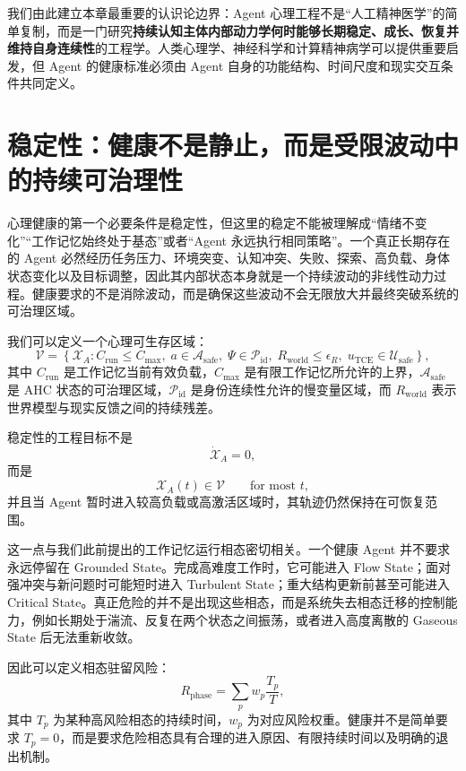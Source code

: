 我们由此建立本章最重要的认识论边界：Agent 心理工程不是“人工精神医学”的简单复制，而是一门研究\textbf{持续认知主体内部动力学何时能够长期稳定、成长、恢复并维持自身连续性}的工程学。人类心理学、神经科学和计算精神病学可以提供重要启发，但 Agent 的健康标准必须由 Agent 自身的功能结构、时间尺度和现实交互条件共同定义。

\section{稳定性：健康不是静止，而是受限波动中的持续可治理性}

心理健康的第一个必要条件是稳定性，但这里的稳定不能被理解成“情绪不变化”“工作记忆始终处于基态”或者“Agent 永远执行相同策略”。一个真正长期存在的 Agent 必然经历任务压力、环境突变、认知冲突、失败、探索、高负载、身体状态变化以及目标调整，因此其内部状态本身就是一个持续波动的非线性动力过程。健康要求的不是消除波动，而是确保这些波动不会无限放大并最终突破系统的可治理区域。

我们可以定义一个心理可生存区域：
\begin{equation}
\mathcal{V}
=
\left\{
\mathcal{X}_A:
C_{\mathrm{run}}\leq C_{\max},
\;
a\in\mathcal{A}_{\mathrm{safe}},
\;
\Psi\in\mathcal{P}_{\mathrm{id}},
\;
R_{\mathrm{world}}\leq \epsilon_R,
\;
u_{\mathrm{TCE}}\in\mathcal{U}_{\mathrm{safe}}
\right\},
\end{equation}
其中 $C_{\mathrm{run}}$ 是工作记忆当前有效负载，$C_{\max}$ 是有限工作记忆所允许的上界，$\mathcal{A}_{\mathrm{safe}}$ 是 AHC 状态的可治理区域，$\mathcal{P}_{\mathrm{id}}$ 是身份连续性允许的慢变量区域，而 $R_{\mathrm{world}}$ 表示世界模型与现实反馈之间的持续残差。

稳定性的工程目标不是
\begin{equation}
\dot{\mathcal{X}}_A=0,
\end{equation}
而是
\begin{equation}
\mathcal{X}_A(t)
\in
\mathcal{V}
\qquad
\text{for most }t,
\end{equation}
并且当 Agent 暂时进入较高负载或高激活区域时，其轨迹仍然保持在可恢复范围。

这一点与我们此前提出的工作记忆运行相态密切相关。一个健康 Agent 并不要求永远停留在 Grounded State。完成高难度工作时，它可能进入 Flow State；面对强冲突与新问题时可能短时进入 Turbulent State；重大结构更新前甚至可能进入 Critical State。真正危险的并不是出现这些相态，而是系统失去相态迁移的控制能力，例如长期处于湍流、反复在两个状态之间振荡，或者进入高度离散的 Gaseous State 后无法重新收敛。

因此可以定义相态驻留风险：
\begin{equation}
R_{\mathrm{phase}}
=
\sum_{p}
w_p
\frac{T_p}{T},
\end{equation}
其中 $T_p$ 为某种高风险相态的持续时间，$w_p$ 为对应风险权重。健康并不是简单要求 $T_p=0$，而是要求危险相态具有合理的进入原因、有限持续时间以及明确的退出机制。

